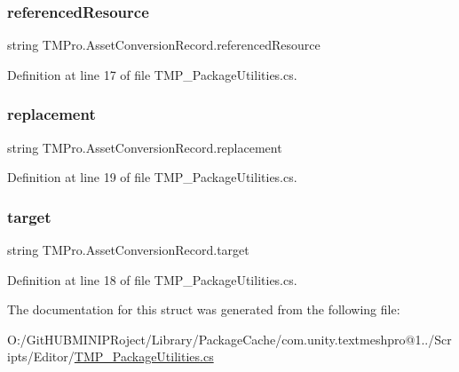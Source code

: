 \subsubsection{\texorpdfstring{referencedResource}{referencedResource}}
{\footnotesize\ttfamily string T\+M\+Pro.\+Asset\+Conversion\+Record.\+referenced\+Resource}



Definition at line 17 of file T\+M\+P\+\_\+\+Package\+Utilities.\+cs.

\mbox{\label{struct_t_m_pro_1_1_asset_conversion_record_a7217cf55ce06161e09a6bb6fa78714b0}} 
\subsubsection{\texorpdfstring{replacement}{replacement}}
{\footnotesize\ttfamily string T\+M\+Pro.\+Asset\+Conversion\+Record.\+replacement}



Definition at line 19 of file T\+M\+P\+\_\+\+Package\+Utilities.\+cs.

\mbox{\label{struct_t_m_pro_1_1_asset_conversion_record_a406640440ce56962696b39a605cc80a6}} 
\subsubsection{\texorpdfstring{target}{target}}
{\footnotesize\ttfamily string T\+M\+Pro.\+Asset\+Conversion\+Record.\+target}



Definition at line 18 of file T\+M\+P\+\_\+\+Package\+Utilities.\+cs.



The documentation for this struct was generated from the following file\+:\begin{DoxyCompactItemize}
\item 
O\+:/\+Git\+H\+U\+B\+M\+I\+N\+I\+P\+Roject/\+Library/\+Package\+Cache/com.\+unity.\+textmeshpro@1../\+Scripts/\+Editor/\mbox{\hyperlink{_t_m_p___package_utilities_8cs}{T\+M\+P\+\_\+\+Package\+Utilities.\+cs}}\end{DoxyCompactItemize}
